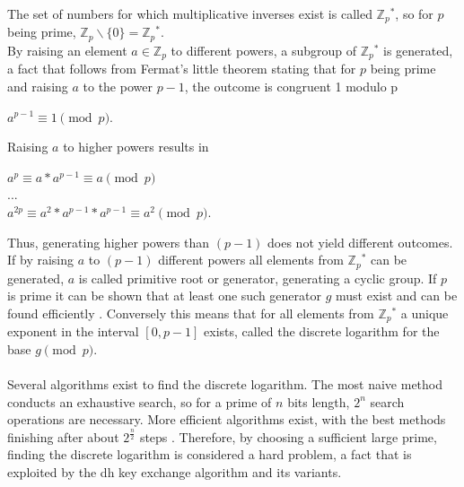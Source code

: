 The set of numbers for which multiplicative inverses exist is called $\mathbb{Z}{_p}^*$, so for $p$ being prime, $\mathbb{Z}_p \backslash \{0\} = \mathbb{Z}{_p}^*$.
\\
By raising an element $a \in \mathbb{Z}_p$ to different powers, a subgroup of $\mathbb{Z}{_p}^*$
is generated, a fact that follows from Fermat's little theorem stating that for $p$ being prime and raising $a$ to the power $p-1$, the outcome is congruent 1
modulo p
\begin{center}
 $a^{p-1} \equiv 1 \pmod p $.
\end{center}
Raising $a$ to higher powers results in
\begin{center}
 $a^{p} \equiv a*a^{p-1} \equiv a \pmod p$ \\
 $...$ \\
 $a^{2p} \equiv a^2 * a^{p-1} * a^{p-1} \equiv a^2 \pmod p$.
\end{center}
Thus, generating higher powers than $(p-1)$ does not yield different outcomes. If by raising $a$ to $(p-1)$ different powers all elements from $\mathbb{Z}{_p}^*$ can
be generated, $a$ is called primitive root or generator, generating a cyclic group.
If $p$ is prime it can be shown that at least one such generator $g$ must exist and can be found efficiently \cite{primitiveRoot}.
Conversely this means that for all elements from  $\mathbb{Z}{_p}^*$ a unique exponent in the interval $[0, p-1]$ exists,
called the discrete logarithm for the base $ g \pmod p$.
\\
\\
Several algorithms exist to find the discrete logarithm.
The most naive method conducts an exhaustive search, so for a prime of $n$ bits length, $2^n$ search operations
are necessary. More efficient algorithms exist, with the best methods finishing after about $2^{\frac{n}{2}}$ steps \cite{5199978}. 
Therefore, by choosing a sufficient large prime, finding the discrete logarithm is considered a hard problem, a fact
that is exploited by the \gls{dh} key exchange algorithm and its variants.

